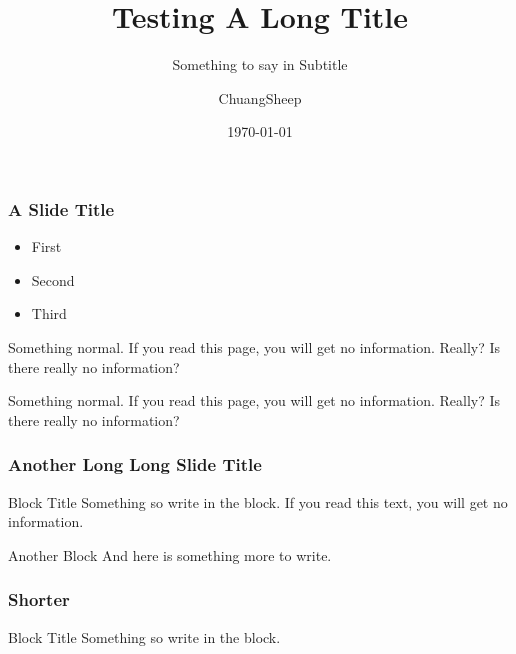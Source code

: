 \documentclass[american,aspectratio=169]{beamer}
\title{Testing A Long Title}
\subtitle{Something to say in Subtitle}
\date{\today}
\author{ChuangSheep}
\begin{document}
\begin{frame} 
  \titlepage
\end{frame} 


\begin{iframe}
  \frametitle{A Slide Title}

  \begin{itemize}
    \item First
    \item Second 
    \item Third
  \end{itemize}

  Something normal. If you read this page, you will get no information. Really? Is there really no information?

  Something normal. If you read this page, you will get no information. Really? Is there really no information?
\end{iframe}

\begin{indentedframe}
  \frametitle{Another Long Long Slide Title}
  \begin{block}{Block Title}
    Something so write in the block. If you read this text, you will get no information. 
  \end{block}
  \begin{block}{Another Block}
    And here is something more to write. 
  \end{block}
\end{indentedframe}

\begin{indentedframe}
  \frametitle{Shorter}
  \begin{block}{Block Title}
    Something so write in the block. 
  \end{block}
\end{indentedframe}

\end{document}

